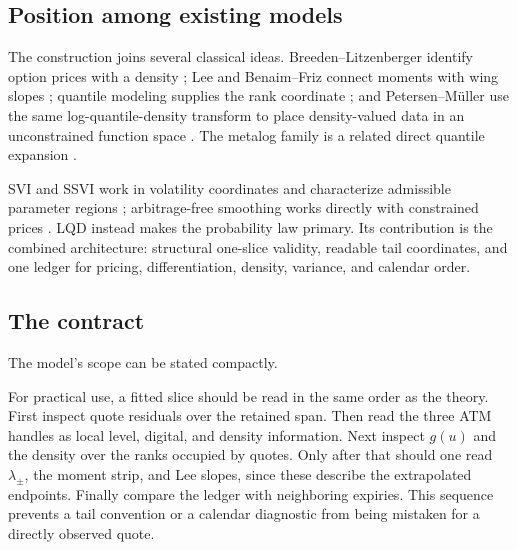 \subsection{Position among existing models}

The construction joins several classical ideas.  Breeden--Litzenberger
identify option prices with a density \citep{BreedenLitzenberger1978}; Lee and
Benaim--Friz connect moments with wing slopes
\citep{Lee2004,BenaimFriz2009}; quantile modeling supplies the rank coordinate
\citep{Parzen1979,Gilchrist2000}; and Petersen--M\"uller use the same
log-quantile-density transform to place density-valued data in an
unconstrained function space \citep{PetersenMuller2016}.  The metalog family
is a related direct quantile expansion \citep{Keelin2016}.

SVI and SSVI work in volatility coordinates and characterize admissible
parameter regions \citep{Gatheral2004,GatheralJacquier2014}; arbitrage-free
smoothing works directly with constrained prices \citep{Fengler2009}.  LQD
instead makes the probability law primary.  Its contribution is the combined
architecture: structural one-slice validity, readable tail coordinates, and
one ledger for pricing, differentiation, density, variance, and calendar
order.

\subsection{The contract}
\label{sec:limits}

The model's scope can be stated compactly.

For practical use, a fitted slice should be read in the same order as the
theory.  First inspect quote residuals over the retained span.  Then read the
three ATM handles as local level, digital, and density information.  Next
inspect $g(u)$ and the density over the ranks occupied by quotes.  Only after
that should one read $\lambda_\pm$, the moment strip, and Lee slopes, since
these describe the extrapolated endpoints.  Finally compare the ledger with
neighboring expiries.  This sequence prevents a tail convention or a
calendar diagnostic from being mistaken for a directly observed quote.

